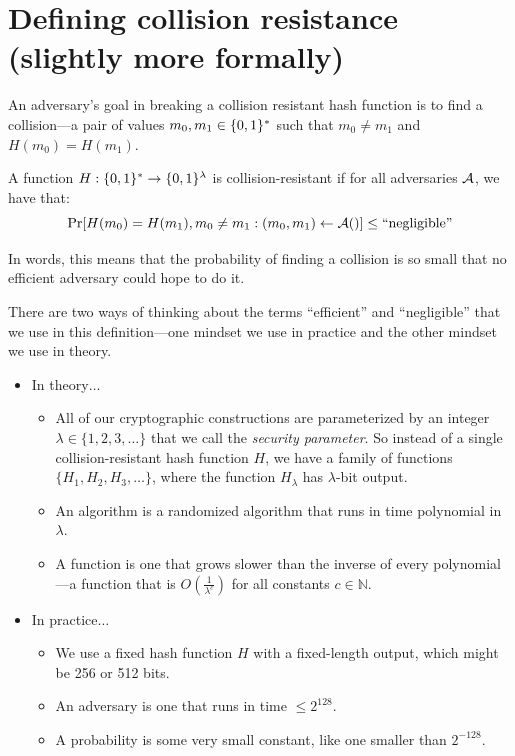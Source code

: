 \section{Defining collision resistance (slightly more formally)}
An adversary's goal in breaking a collision
resistant hash function is to find a collision---a
pair of values $m_0, m_1 \in \{0,1\}^*$ such that
$m_0 \neq m_1$ and $H(m_0) = H(m_1)$.

\begin{definition}\label{def:crhf}
	A function $H: \{0,1\}^* \rightarrow \{0,1\}^{\lambda}$ is collision-resistant 
  if for all  adversaries $\mathcal{A}$, we have that:
  \[ \Pr[H(m_0) = H(m_1), m_0 \neq m_1: (m_0, m_1) \leftarrow \mathcal{A}()] \leq \text{``negligible''} \]
\end{definition}

In words, this means that the probability of finding a collision is so small that no efficient adversary could hope to do it.

There are two ways of thinking about the terms ``efficient'' and ``negligible'' that 
we use in this definition---one mindset we use in practice and the other mindset we use in theory.

\begin{itemize}
	\item In theory$\ldots$
		\begin{itemize}
      \item All of our cryptographic constructions are parameterized by an integer $\lambda \in \{1, 2, 3, \dots\}$
            that we call the \textit{security parameter}.
            So instead of a single collision-resistant hash function $H$, we have a family of functions
            $\{ H_1, H_2, H_3, \dots \}$, where the function $H_\lambda$ has $\lambda$-bit output. 
			\item An  algorithm is a randomized algorithm that runs in time polynomial in $\lambda$.
			\item A  function is one that grows slower than the inverse of every polynomial---a function that is $O(\frac{1}{\lambda^c})$
            for all constants $c \in \mathbb{N}$.  
		\end{itemize}
	\item In practice$\ldots$
		\begin{itemize}
			\item We use a fixed hash function $H$ with a fixed-length output,
        which might be 256 or 512 bits.
			\item An  adversary is one that runs in time $\leq 2^{128}$.
			\item A  probability is some very small constant, like one smaller than $2^{-128}$.
		\end{itemize}
\end{itemize}

